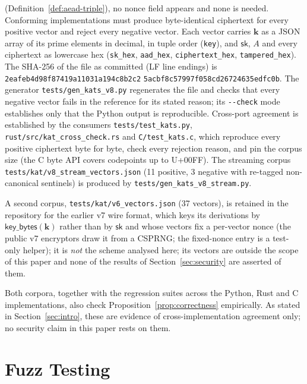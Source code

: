 \documentclass[11pt,a4paper]{article}
\begin{document}
(Definition~\ref{def:aead-triple}), no nonce field appears and none is
needed. Conforming implementations must produce byte-identical ciphertext
for every positive vector and reject every negative vector. Each vector
carries $\mathbf{k}$ as a JSON array of its prime elements in decimal, in
tuple order (\texttt{key}), and $\mathsf{sk}$, $A$ and every ciphertext as
lowercase hex (\texttt{sk\_hex}, \texttt{aad\_hex}, \texttt{ciphertext\_hex},
\texttt{tampered\_hex}). The SHA-256 of the file as committed (LF line
endings) is \texttt{2eafeb4d98f87419a11031a194c8b2c2}\allowbreak
\texttt{5acbf8c57997f058cd26724635edfc0b}. The generator
\texttt{tests/gen\_kats\_v8.py} regenerates the file and checks that every
negative vector fails in the reference for its stated reason; its
\texttt{-{}-check} mode establishes only that the Python output is
reproducible. Cross-port agreement is established by the consumers
\texttt{tests/test\_kats.py}, \texttt{rust/src/kat\_cross\_check.rs} and
\texttt{C/test\_kats.c}, which reproduce every positive ciphertext byte for
byte, check every rejection reason, and pin the corpus size (the C byte API
covers codepoints up to U+00FF). The streaming corpus
\texttt{tests/kat/v8\_stream\_vectors.json} (11 positive, 3 negative with
re-tagged non-canonical sentinels) is produced by
\texttt{tests/gen\_kats\_v8\_stream.py}.

A second corpus, \texttt{tests/kat/v6\_vectors.json} (37 vectors), is
retained in the repository for the earlier v7 wire format, which keys its
derivations by $\mathsf{key\_bytes}(\mathbf{k})$ rather than by
$\mathsf{sk}$ and whose vectors
fix a per-vector nonce (the public v7 encryptors draw it from a CSPRNG; the
fixed-nonce entry is a test-only helper); it is \emph{not} the scheme analysed here; its
vectors are outside the scope of this paper and none of the results of
Section~\ref{sec:security} are asserted of them.

Both corpora, together with the regression suites across the Python, Rust
and C implementations, also check Proposition~\ref{prop:correctness}
empirically. As stated in Section~\ref{sec:intro}, these are evidence of
cross-implementation agreement only; no security claim in this paper rests
on them.

\section{Fuzz Testing}
\label{sec:fuzz}
\end{document}
